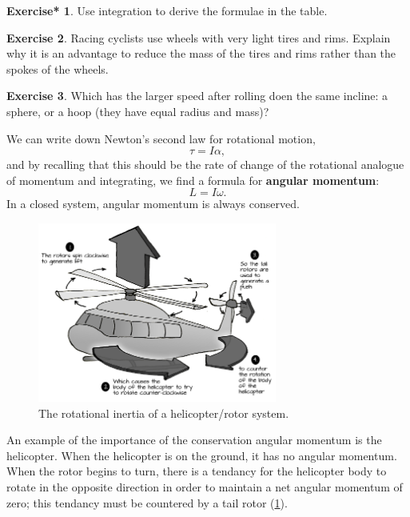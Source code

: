 \documentclass[a4paper]{amsbook}
\theoremstyle{definition}
\newtheorem{exercise}{Exercise}
\numberwithin{exercise}{chapter}
\newtheorem{exercise*}[exercise]{Exercise*}
\numberwithin{exercise}{chapter}
\begin{document}
\begin{exercise*}
  Use integration to derive the formulae in the table.
\end{exercise*}

\begin{exercise}
  Racing cyclists use wheels with very light tires and rims. Explain why it is an advantage to reduce the mass of
  the tires and rims rather than the spokes of the wheels.
\end{exercise}

\begin{exercise}
  Which has the larger speed after rolling doen the same incline: a sphere, or a hoop (they have equal radius and mass)?
\end{exercise}

We can write down Newton's second law for rotational motion,
\begin{equation}
  \tau = I \alpha,
\end{equation}
and by recalling that this should be the rate of change of the rotational analogue of momentum and integrating,
we find a formula for \textbf{angular momentum}:
\begin{equation}
  L = I\omega.
\end{equation}
In a closed system, angular momentum is always conserved.

\begin{figure}
  \centering
  \includegraphics[width=0.7\textwidth]{helicopter}
  \caption{The rotational inertia of a helicopter/rotor system.\label{fig:helicopter}}
\end{figure}

An example of the importance of the conservation angular momentum is the helicopter. When the helicopter is on the ground, it has no angular
momentum. When the rotor begins to turn, there is a tendancy for the helicopter body to rotate in the opposite direction in order to maintain
a net angular momentum of zero; this tendancy must be countered by a tail rotor (\cref{fig:helicopter}).
\end{document}
